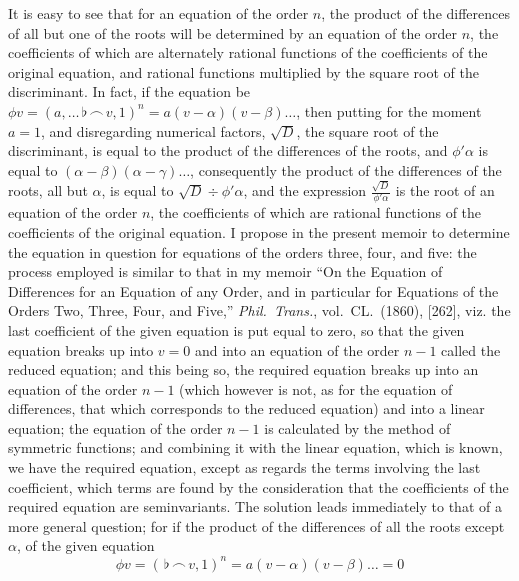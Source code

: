 \documentclass[11pt,a4paper]{book}
\begin{document}
It is easy to see that for an equation of the order $n$, the product of the differences of all but one of the roots will be determined by an equation of the order $n$, the coefficients of which are alternately rational functions of the coefficients of the original equation, and rational functions multiplied by the square root of the discriminant. In fact, if the equation be $\phi v=(a,\ldots\,\flat\,\frown\, v,1)^n=a(v-\alpha)(v-\beta)\ldots$, then putting for the moment $a=1$, and disregarding numerical factors, $\sqrt{D}$, the square root of the discriminant, is equal to the product of the differences of the roots, and $\phi'\alpha$ is equal to $(\alpha-\beta)(\alpha-\gamma)\ldots$, consequently the product of the differences of the roots, all but $\alpha$, is equal to $\sqrt{D}\div\phi'\alpha$, and the expression $\frac{\sqrt{D}}{\phi'\alpha}$ is the root of an equation of the order $n$, the coefficients of which are rational functions of the coefficients of the original equation. I propose in the present memoir to determine the equation in question for equations of the orders three, four, and five: the process employed is similar to that in my memoir ``On the Equation of Differences for an Equation of any Order, and in particular for Equations of the Orders Two, Three, Four, and Five,'' \textit{Phil.\ Trans.}, vol.~CL.\ (1860), [262], viz. the last coefficient of the given equation is put equal to zero, so that the given equation breaks up into $v=0$ and into an equation of the order $n-1$ called the reduced equation; and this being so, the required equation breaks up into an equation of the order $n-1$ (which however is not, as for the equation of differences, that which corresponds to the reduced equation) and into a linear equation; the equation of the order $n-1$ is calculated by the method of symmetric functions; and combining it with the linear equation, which is known, we have the required equation, except as regards the terms involving the last coefficient, which terms are found by the consideration that the coefficients of the required equation are seminvariants. The solution leads immediately to that of a more general question; for if the product of the differences of all the roots except $\alpha$, of the given equation
\[
\phi v=(\,\flat\,\frown\, v,1)^n=a(v-\alpha)(v-\beta)\ldots=0
\]
\end{document}
